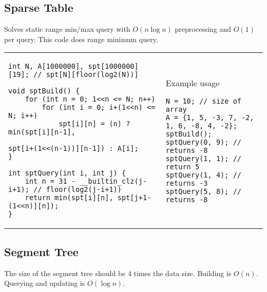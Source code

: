 \documentclass[letterpaper]{article}
\begin{document}
\subsection{Sparse Table}

Solves static range min/max query with $O\left(n\log n\right)$ preprocessing and $O\left(1\right)$ per query. This code does range minimum query.

\begin{tabular}{@{}p{12cm}p{6cm}@{}}
\vspace*{-1em}
\begin{lstlisting}
int N, A[1000000], spt[1000000][19]; // spt[N][floor(log2(N))]

void sptBuild() {
	for (int n = 0; 1<<n <= N; n++)
		for (int i = 0; i+(1<<n) <= N; i++)
			spt[i][n] = (n) ? min(spt[i][n-1],
			                      spt[i+(1<<(n-1))][n-1]) : A[i];
}

int sptQuery(int i, int j) {
	int n = 31 - __builtin_clz(j-i+1); // floor(log2(j-i+1))
	return min(spt[i][n], spt[j+1-(1<<n)][n]);
}
\end{lstlisting}
&
Example usage
\begin{lstlisting}
N = 10; // size of array
A = {1, 5, -3, 7, -2, 1, 6, -8, 4, -2};
sptBuild();
sptQuery(0, 9); // returns -8
sptQuery(1, 1); // return 5
sptQuery(1, 4); // returns -3
sptQuery(5, 8); // returns -8
\end{lstlisting}
\end{tabular}

\clearpage

\subsection{Segment Tree}

The size of the segment tree should be 4 times the data size. Building is $O\left(n\right)$. Querying and updating is $O\left(\log n\right)$.
\end{document}
